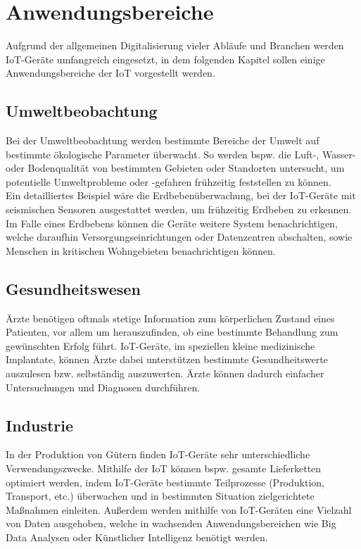 \section{Anwendungsbereiche}
Aufgrund der allgemeinen Digitalisierung vieler Abläufe und Branchen werden IoT-Geräte umfangreich eingesetzt,
in dem folgenden Kapitel sollen einige Anwendungsbereiche der IoT vorgestellt werden. 

\subsection{Umweltbeobachtung}
Bei der Umweltbeobachtung werden bestimmte Bereiche der Umwelt auf bestimmte ökologische Parameter überwacht. 
So werden bspw. die Luft-, Wasser- oder Bodenqualität von bestimmten Gebieten oder Standorten 
untersucht, um potentielle Umweltprobleme oder -gefahren frühzeitig feststellen zu können. \\

Ein detailliertes Beispiel wäre die Erdbebenüberwachung, bei der IoT-Geräte mit seismischen Sensoren
ausgestattet werden, um frühzeitig Erdbeben zu erkennen. Im Falle eines Erdbebens können die Geräte
weitere System benachrichtigen, welche daraufhin Versorgungseinrichtungen oder  Datenzentren
abschalten, sowie Menschen in kritischen Wohngebieten benachrichtigen können.

\subsection{Gesundheitswesen}
Ärzte benötigen oftmals stetige Information zum körperlichen Zustand eines Patienten, vor allem um
herauszufinden, ob eine bestimmte Behandlung zum gewünschten Erfolg führt. IoT-Geräte, im speziellen
kleine medizinische Implantate, können Ärzte dabei unterstützen bestimmte Gesundheitswerte auszulesen bzw. 
selbständig auszuwerten. Ärzte können dadurch einfacher Untersuchungen und Diagnosen durchführen.

\subsection{Industrie}
In der Produktion von Gütern finden IoT-Geräte sehr unterschiedliche Verwendungszwecke. Mithilfe der IoT können
bspw. gesamte Lieferketten optimiert werden, indem IoT-Geräte bestimmte Teilprozesse (Produktion, Transport, etc.)
überwachen und in bestimmten Situation zielgerichtete Maßnahmen einleiten. Außerdem werden mithilfe von IoT-Geräten eine 
Vielzahl von Daten ausgehoben, welche in wachsenden Anwendungsbereichen wie Big Data Analysen oder Künstlicher Intelligenz 
benötigt werden.

